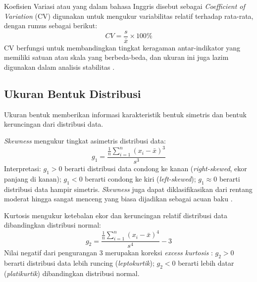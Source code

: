 \begin{definition}
  Koefisien Variasi atau yang dalam bahasa Inggris disebut sebagai \textit{Coefficient of Variation} (CV) digunakan untuk mengukur variabilitas relatif terhadap rata-rata, dengan rumus sebagai berikut:
  \begin{equation} \label{eq:cv}
    CV = \frac{s}{\bar{x}} \times 100\%
  \end{equation}
  CV berfungsi untuk membandingkan tingkat keragaman antar-indikator yang memiliki satuan atau skala yang berbeda-beda, dan ukuran ini juga lazim digunakan dalam analisis stabilitas \citep{deptan2003}.
\end{definition}

\subsection{\normalsize Ukuran Bentuk Distribusi}

Ukuran bentuk memberikan informasi karakteristik bentuk simetris dan bentuk keruncingan dari distribusi data.

\begin{definition}
  \textit{Skewness} mengukur tingkat asimetris distribusi data:
  \begin{equation} \label{eq:skewness}
    g_1 = \frac{\frac{1}{n}\sum_{i=1}^{n}(x_i - \bar{x})^3}{s^3}
  \end{equation}
  Interpretasi: $g_1 > 0$ berarti distribusi data condong ke kanan (\textit{right-skewed}, ekor panjang di kanan); $g_1 < 0$ berarti condong ke kiri (\textit{left-skewed}); $g_1 \approx 0$ berarti distribusi data hampir simetris. \textit{Skewness} juga dapat diklasifikasikan dari rentang moderat hingga sangat menceng yang biasa dijadikan sebagai acuan baku \citep{bulmer1979}.
\end{definition}

\begin{definition}
  Kurtosis mengukur ketebalan ekor dan keruncingan relatif distribusi data dibandingkan distribusi normal:
  \begin{equation} \label{eq:kurtosis}
    g_2 = \frac{\frac{1}{n}\sum_{i=1}^{n}(x_i - \bar{x})^4}{s^4} - 3
  \end{equation}
  Nilai negatif dari pengurangan 3 merupakan koreksi \textit{excess kurtosis} \citep{mathworld}: $g_2 > 0$ berarti distribusi data lebih runcing (\textit{leptokurtik}); $g_2 < 0$ berarti lebih datar (\textit{platikurtik}) dibandingkan distribusi normal.
\end{definition}

